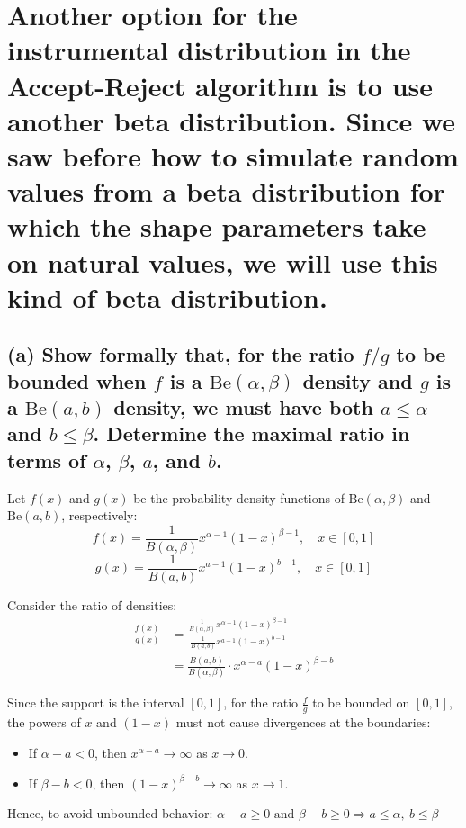 \newpage

\section{Another option for the instrumental distribution in the Accept-Reject algorithm is to use another beta distribution. Since we saw before how to simulate random values from a beta distribution for which the shape parameters take on natural values, we will use this kind of beta distribution.}



\subsection*{(a) Show formally that, for the ratio $f/g$ to be bounded when $f$ is a $\text{Be}(\alpha, \beta)$ density and $g$ is a $\text{Be}(a, b)$ density, we must have both $a \leq \alpha$ and $b \leq \beta$. Determine the maximal ratio in terms of $\alpha$, $\beta$, $a$, and $b$.}

Let \(f(x)\) and \(g(x)\) be the probability density functions of \(\text{Be}(\alpha, \beta)\) and \(\text{Be}(a, b)\), respectively:
\begin{equation}
f(x) = \frac{1}{B(\alpha, \beta)} x^{\alpha - 1} (1 - x)^{\beta - 1}, \quad x \in [0,1]
\end{equation}
\begin{equation}
g(x) = \frac{1}{B(a, b)} x^{a - 1} (1 - x)^{b - 1}, \quad x \in [0,1]
\end{equation}

Consider the ratio of densities:
\begin{align}
\frac{f(x)}{g(x)} &= \frac{\frac{1}{B(\alpha, \beta)} x^{\alpha - 1} (1 - x)^{\beta - 1}}{\frac{1}{B(a, b)} x^{a - 1} (1 - x)^{b - 1}} \\
&= \frac{B(a, b)}{B(\alpha, \beta)} \cdot x^{\alpha - a} (1 - x)^{\beta - b}
\end{align}

Since the support is the interval \([0,1]\), for the ratio \(\frac{f}{g}\) to be bounded on \([0,1]\), the powers of \(x\) and \((1 - x)\) must not cause divergences at the boundaries:
\begin{itemize}
    \item If \(\alpha - a < 0\), then \(x^{\alpha - a} \to \infty\) as \(x \to 0\).
    \item If \(\beta - b < 0\), then \((1 - x)^{\beta - b} \to \infty\) as \(x \to 1\).
\end{itemize}
Hence, to avoid unbounded behavior: $\alpha - a \geq 0 \text{ and } \beta - b \geq 0 \Rightarrow a \leq \alpha,\ b \leq \beta$


